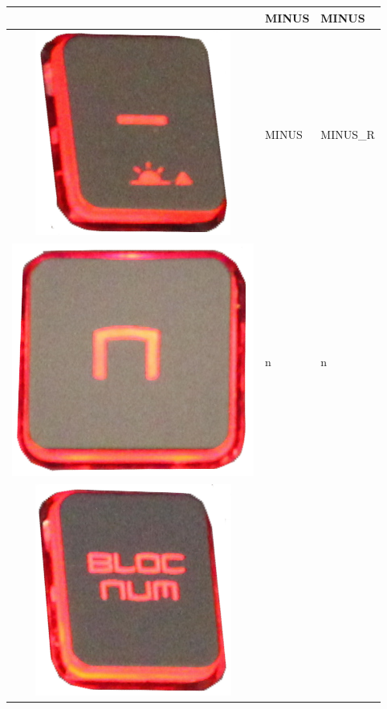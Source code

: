 \begin{longtable}{|cll|}
\begin{minipage}[c]{.3\textwidth}
\vspace{0.2cm}
\end{minipage} & MINUS & MINUS\\
\hline
\begin{minipage}[c]{.3\textwidth}
\vspace{0.2cm}
\includegraphics[scale=0.06]{Images/KeyMapping/MINUS_R}
\vspace{0.2cm}
\end{minipage} & MINUS & MINUS\_R\\
\hline
\begin{minipage}[c]{.3\textwidth}
\vspace{0.2cm}
\includegraphics[scale=0.06]{Images/KeyMapping/n}
\vspace{0.2cm}
\end{minipage} & n & n\\
\hline
\begin{minipage}[c]{.3\textwidth}
\vspace{0.2cm}
\includegraphics[scale=0.06]{Images/KeyMapping/NUM_LOCK}

\end{minipage}
\end{longtable}

